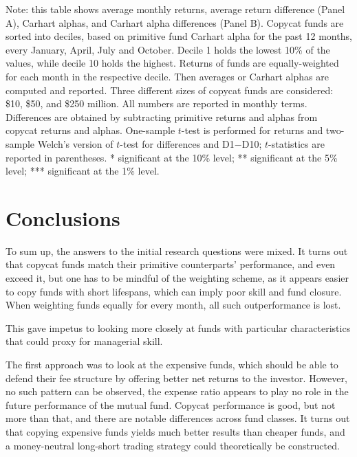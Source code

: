 \documentclass[12pt, a4]{article}
\begin{document}
\begin{landscape}
\begin{table*}[p]
\begin{threeparttable}
			\label{tab:past_alphas_deciles}%
			\begin{tablenotes}
				\tiny
				\item Note: this table shows average monthly returns, average return difference (Panel A), Carhart alphas, and Carhart alpha differences (Panel B). Copycat funds are sorted into deciles, based on primitive fund Carhart alpha for the past 12 months, every January, April, July and October. Decile 1 holds the lowest 10\% of the values, while decile 10 holds the highest. Returns of funds are equally-weighted for each month in the respective decile. Then averages or Carhart alphas are computed and reported. Three different sizes of copycat funds are considered: \$10, \$50, and \$250 million. All numbers are reported in monthly terms. Differences are obtained by subtracting primitive returns and alphas from copycat returns and alphas. One-sample $t$-test is performed for returns and two-sample Welch's version of $t$-test for differences and D1$-$D10; $t$-statistics are reported in parentheses. * significant at the 10\% level; ** significant at the 5\% level; *** significant at the 1\% level.
			\end{tablenotes}
		\end{threeparttable}
	\end{table*}
	
\end{landscape}
\restoregeometry

\clearpage
\section{Conclusions} \label{sec:conclusions}

To sum up, the answers to the initial research questions were mixed. It turns out that copycat funds match their primitive counterparts' performance, and even exceed it, but one has to be mindful of the weighting scheme, as it appears easier to copy funds with short lifespans, which can imply poor skill and fund closure. When weighting funds equally for every month, all such outperformance is lost.

This gave impetus to looking more closely at funds with particular characteristics that could proxy for managerial skill.

The first approach was to look at the expensive funds, which should be able to defend their fee structure by offering better net returns to the investor. However, no such pattern can be observed, the expense ratio appears to play no role in the future performance of the mutual fund. Copycat performance is good, but not more than that, and there are notable differences across fund classes. It turns out that copying expensive funds yields much better results than cheaper funds, and a money-neutral long-short trading strategy could theoretically be constructed. 
\end{document}
